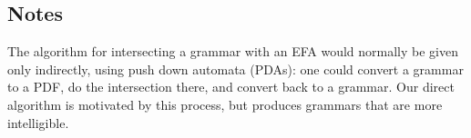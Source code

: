 %

\subsection{Notes}

The algorithm for intersecting a grammar with an EFA would normally be given
only indirectly, using push down automata (PDAs): one could convert a grammar
to a PDF, do the intersection there, and convert back to a grammar.  Our direct
algorithm is motivated by this process, but produces grammars that are more
intelligible.

